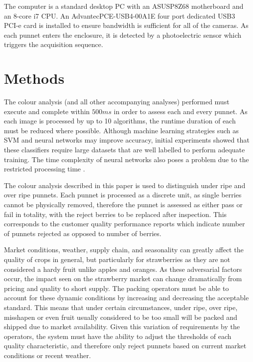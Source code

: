 \documentclass[fleqn,twoside,12pt]{report}
\begin{document}
The computer is a standard desktop PC with an ASUS\textregistered P8Z68 motherboard and an 8-core i7 CPU. An Advantec\textregistered PCE-USB4-00A1E four port dedicated USB3 PCI-e card is installed to ensure bandwidth is sufficient for all of the cameras. As each punnet enters the enclosure, it is detected by a photoelectric sensor which triggers the acquisition sequence.  

\section{Methods}
\label{sec:colour_analysis}

The colour analysis (and all other accompanying analyses) performed must execute and complete within $500ms$ in order to assess each and every punnet. As each image is processed by up to 10 algorithms, the runtime duration of each must be reduced where possible. Although machine learning strategies such as SVM and neural networks may improve accuracy, initial experiments showed that these classifiers require large datasets that are well labelled to perform adequate training. The time complexity of neural networks also poses a problem due to the restricted processing time \cite{he, angiulli}. 

The colour analysis described in this paper is used to distinguish under ripe and over ripe punnets. Each punnet is processed as a discrete unit, as single berries cannot be physically removed, therefore the punnet is assessed as either pass or fail in totality, with the reject berries to be replaced after inspection. This corresponds to the customer quality performance reports which indicate number of punnets rejected as opposed to number of berries. 

Market conditions, weather, supply chain, and seasonality can greatly affect the quality of crops in general, but particularly for strawberries as they are not considered a hardy fruit unlike apples and oranges. As these adversarial factors occur, the impact seen on the strawberry market can change dramatically from pricing and quality to short supply. The packing operators must be able to account for these dynamic conditions by increasing and decreasing the acceptable standard. This means that under certain circumstances, under ripe, over ripe, misshapen or even fruit usually considered to be too small will be packed and shipped due to market availability. Given this variation of requirements by the operators, the system must have the ability to adjust the thresholds of each quality characteristic, and therefore only reject punnets based on current market conditions or recent weather. 
\end{document}
